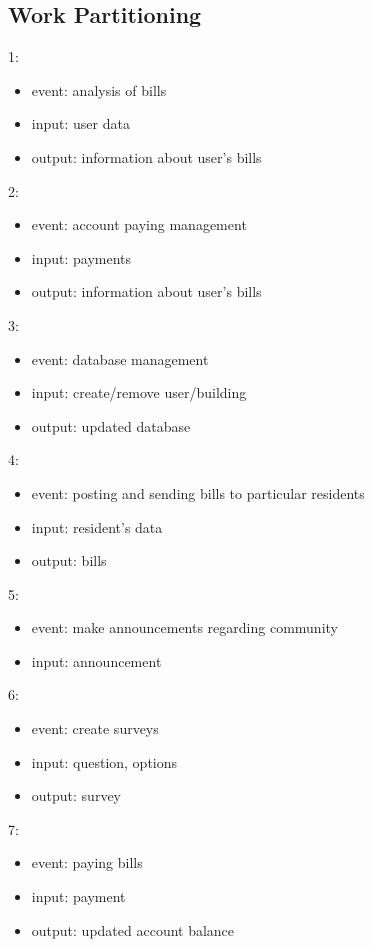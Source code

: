 \documentclass[a4paper,10pt]{report}
\begin{document}
\subsection{Work Partitioning}
1:
\begin{itemize}
\item event: analysis of bills
\item input: user data
\item output: information about user's bills
\end{itemize}
2:
\begin{itemize}
\item event: account paying management
\item input: payments
\item output: information about user's bills

\end{itemize}
3:
\begin{itemize}
\item event: database management
\item input: create/remove user/building
\item output: updated database 
 
\end{itemize}
4:
\begin{itemize}
\item event: posting and sending bills to particular residents
\item input: resident's data
\item output: bills
 
\end{itemize}
5:
\begin{itemize}
\item event: make announcements regarding community
\item input: announcement
\end{itemize}
6:
\begin{itemize}
\item event: create surveys
\item input: question, options
\item output: survey

\end{itemize}
7:
\begin{itemize}
\item event: paying bills
\item input: payment
\item output: updated account balance 
\end{itemize}
\end{document}
